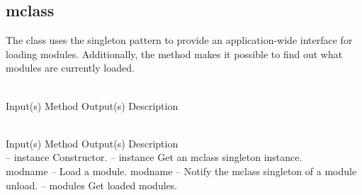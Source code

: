 %
%
%
%
%

\subsection{mclass}
\label{sec:mclass}

The  class uses the singleton pattern to provide an
application-wide interface for loading modules.  Additionally, the
 method makes it possible to
find out what modules are currently loaded.

\begin{longtable}{}
\caption{mclass summary}
\\
\hline
\optableent
	{Input(s)}
	{Method}
	{Output(s)}
	{Description}
\hline \hline
\endfirsthead
\caption[]{\emph{continued}} \\
\hline
\optableent
	{Input(s)}
	{Method}
	{Output(s)}
	{Description}
\hline \hline \endhead
{} \endfoot
\hline \endlastfoot
 \\
\hline \hline
\optableent
	{--}
	{{\bf {}}}
	{instance}
	{Constructor.}
\hline
\optableent
	{--}
	{{\bf {}}}
	{instance}
	{Get an mclass singleton instance.}
\hline \hline
{} \\
\hline \hline
\optableent
	{modname}
	{{\bf {}}}
	{--}
	{Load a module.}
\hline
\optableent
	{modname}
	{{\bf {}}}
	{--}
	{Notify the mclass singleton of a module unload.}
\hline
\optableent
	{--}
	{{\bf {}}}
	{modules}
	{Get loaded modules.}
\end{longtable}

